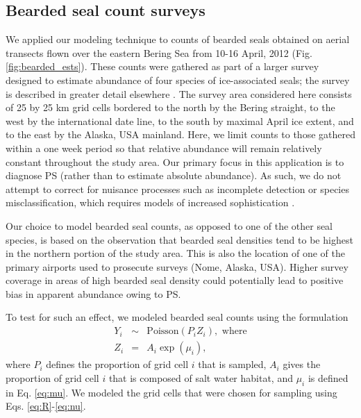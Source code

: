 \documentclass[times,mee,doublespace,]{besauth2}
\begin{document}
\subsection{Bearded seal count surveys}

We applied our modeling technique to counts of bearded seals obtained on aerial transects flown over the eastern Bering Sea from 10-16 April, 2012 (Fig. \ref{fig:bearded_ests}). These counts were gathered as part of a larger survey designed to estimate abundance of four species of ice-associated seals; the survey is described in greater detail elsewhere \citep{ConnEtAl2014,ConnEtAl2015}. The survey area considered here consists of 25 by 25 km grid cells bordered to the north by the Bering straight, to the west by the international date line, to the south by maximal April ice extent, and to the east by the Alaska, USA mainland. Here, we limit counts to those gathered within a one week period so that relative abundance will remain relatively constant throughout the study area.  Our primary focus in this application is to diagnose PS (rather than to estimate absolute abundance).  As such, we do not attempt to correct for nuisance processes such as incomplete detection or species misclassification, which requires models of increased sophistication \citep{ConnEtAl2014}.

Our choice to model bearded seal counts, as opposed to one of the other seal species, is based on the observation that bearded seal densities tend to be highest in the northern portion of the study area. This is also the location of one of the primary airports used to prosecute surveys (Nome, Alaska, USA).  Higher survey coverage in areas of high bearded seal density could potentially lead to positive bias in apparent abundance owing to PS.

To test for such an effect, we modeled bearded seal counts using the formulation
\begin{eqnarray*}
  Y_i & \sim & \textrm{Poisson}(P_i Z_i), \text{ where}\\
  Z_i & = & A_i \exp(\mu_i),
 \end{eqnarray*}
where $P_i$ defines the proportion of grid cell $i$ that is sampled, $A_i$ gives the proportion of grid cell $i$ that is composed of salt water habitat, and $\mu_i$ is defined in Eq. \ref{eq:mu}.
We modeled the grid cells that were chosen for sampling using Eqs. \ref{eq:R}-\ref{eq:nu}.  
\end{document}

